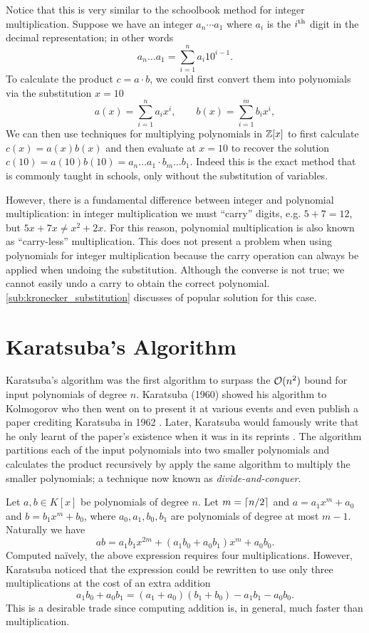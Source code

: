 Notice that this is very similar to the schoolbook method for integer multiplication. Suppose we have an integer $a_n \cdots a_1$ where $a_i$ is the $i^\textrm{th}$ digit in the decimal representation; in other words
\[
    a_n \ldots a_1 = \sum^n_{i=1} a_i 10^{i-1}.
\]
To calculate the product $c = a \cdot b$, we could first convert them into polynomials via the substitution $x = 10$
\[
    a(x) = \sum^n_{i=1} a_ix^i, \qquad b(x) = \sum^m_{i=1} b_ix^i,
\]
We can then use techniques for multiplying polynomials in ${\mathbb Z}[x]$ to first calculate $c(x) = a(x)b(x)$ and then evaluate at $x = 10$ to recover the solution $c(10) = a(10)b(10) = a_n\ldots a_1 \cdot b_m\ldots b_1$. Indeed this is the exact method that is commonly taught in schools, only without the substitution of variables.

However, there is a fundamental difference between integer and polynomial multiplication: in integer multiplication we must ``carry'' digits, e.g. $5 + 7 = 12$, but $5x + 7x \neq x^2 + 2x$. For this reason, polynomial multiplication is also known as ``carry-less'' multiplication. This does not present a problem when using polynomials for integer multiplication because the carry operation can always be applied when undoing the substitution. Although the converse is not true; we cannot easily undo a carry to obtain the correct polynomial. \ref{sub:kronecker_substitution} discusses of popular solution for this case.

\section{Karatsuba's Algorithm}
\label{sec:prelim-karatsuba}

Karatsuba's algorithm was the first algorithm to surpass the $\mathcal O(n^2)$ bound for input polynomials of degree $n$. Karatsuba (1960) showed his algorithm to Kolmogorov who then went on to present it at various events and even publish a paper crediting Karatsuba in 1962 \cite{karatsuba}. Later, Karatsuba would famously write that he only learnt of the paper's existence when it was in its reprints \cite{karatsuba1995}. The algorithm partitions each of the input polynomials into two smaller polynomials and calculates the product recursively by apply the same algorithm to multiply the smaller polynomials; a technique now known as \emph{divide-and-conquer}.

Let $a, b \in K[x]$ be polynomials of degree $n$. Let $m = \left \lceil n/2 \right \rceil$ and $a = a_1x^m + a_0$ and $b = b_1x^m + b_0$, where $a_0, a_1, b_0, b_1$ are polynomials of degree at most $m - 1$. Naturally we have
\begin{equation}\label{eq:karatsuba-easy}
    ab = a_1b_1x^{2m} + (a_1b_0 + a_0b_1)x^m + a_0b_0.
\end{equation}
Computed na\"{i}vely, the above expression requires four multiplications. However, Karatsuba noticed that the expression could be rewritten to use only three multiplications at the cost of an extra addition
\begin{equation}\label{eq:karatsuba-trick}
    a_1b_0 + a_0b_1 = (a_1 + a_0)(b_1 + b_0) - a_1b_1 - a_0b_0.
\end{equation}
This is a desirable trade since computing addition is, in general, much faster than multiplication.

